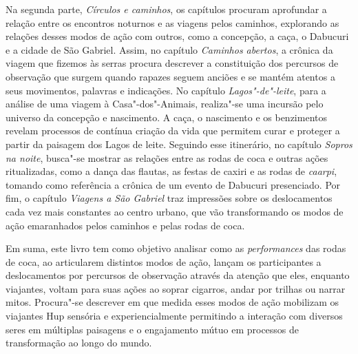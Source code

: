 Na segunda parte, \textit{Círculos e caminhos}, os capítulos procuram
aprofundar a relação entre os encontros noturnos e as viagens pelos
caminhos, explorando as relações desses modos de ação com outros, como a
concepção, a caça, o Dabucuri e a cidade de São Gabriel. Assim, no
capítulo \textit{Caminhos abertos}, a crônica da viagem que fizemos às
serras procura descrever a constituição dos percursos de observação que
surgem quando rapazes seguem anciões e se mantém atentos a seus
movimentos, palavras e indicações. No capítulo \textit{Lagos"-de"-leite},
para a análise de uma viagem à Casa"-dos"-Animais, realiza"-se uma incursão
pelo universo da concepção e nascimento. A caça, o nascimento e os
benzimentos revelam processos de contínua criação da vida que permitem
curar e proteger a partir da paisagem dos Lagos de leite. Seguindo esse
itinerário, no capítulo \textit{Sopros na noite}, busca"-se mostrar as
relações entre as rodas de coca e outras ações ritualizadas, como a
dança das flautas, as festas de caxiri e as rodas de \textit{caarpi}, tomando
como referência a crônica de um evento de Dabucuri presenciado. Por fim,
o capítulo \textit{Viagens a São Gabriel} traz impressões sobre os
deslocamentos cada vez mais constantes ao centro urbano, que vão
transformando os modos de ação emaranhados pelos caminhos e pelas rodas
de coca.

Em suma, este livro tem como objetivo analisar como as
\textit{performances} das rodas de coca, ao articularem distintos modos de
ação, lançam os participantes a deslocamentos por percursos de
observação através da atenção que eles, enquanto viajantes, voltam para
suas ações ao soprar cigarros, andar por trilhas ou narrar mitos.
Procura"-se descrever em que medida esses modos de ação mobilizam os
viajantes Hup sensória e experiencialmente permitindo a interação com
diversos seres em múltiplas paisagens e o engajamento mútuo em processos
de transformação ao longo do mundo.